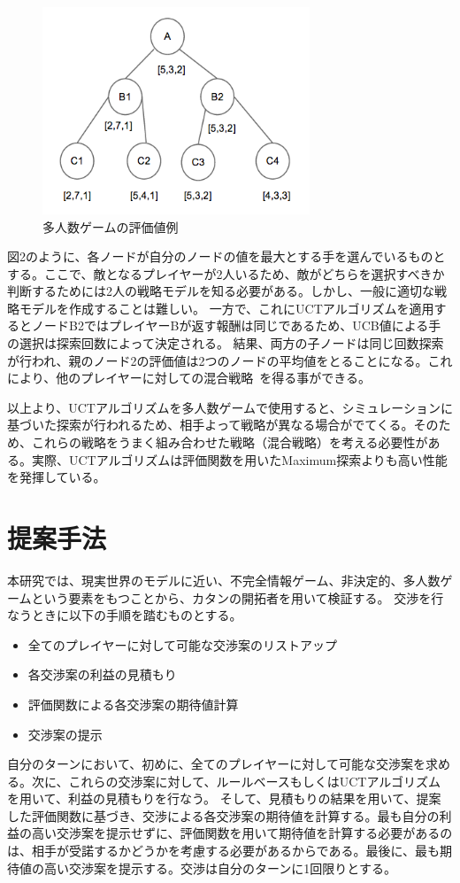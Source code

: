 \documentclass[a4, 10pt,dvipdfmx]{jsarticle}
\begin{document}
\begin{figure}[t]
    \begin{center}
      \includegraphics[width=80mm]{img/multi_agent_tree.png}
    \end{center}
    \caption{多人数ゲームの評価値例}
    \label{multi_agent_tree}
\end{figure}

図2のように、各ノードが自分のノードの値を最大とする手を選んでいるものとする。ここで、敵となるプレイヤーが2人いるため、敵がどちらを選択すべきか判断するためには2人の戦略モデルを知る必要がある。しかし、一般に適切な戦略モデルを作成することは難しい。
一方で、これにUCTアルゴリズムを適用するとノードB2ではプレイヤーBが返す報酬は同じであるため、UCB値による手の選択は探索回数によって決定される。
結果、両方の子ノードは同じ回数探索が行われ、親のノード2の評価値は2つのノードの平均値をとることになる。これにより、他のプレイヤーに対しての混合戦略~\cite{nash1951non}を得る事ができる。

以上より、UCTアルゴリズムを多人数ゲームで使用すると、シミュレーションに基づいた探索が行われるため、相手よって戦略が異なる場合がでてくる。そのため、これらの戦略をうまく組み合わせた戦略（混合戦略）を考える必要性がある。実際、UCTアルゴリズムは評価関数を用いたMaximum探索よりも高い性能を発揮している。


\section{提案手法}

本研究では、現実世界のモデルに近い、不完全情報ゲーム、非決定的、多人数ゲームという要素をもつことから、カタンの開拓者を用いて検証する。
交渉を行なうときに以下の手順を踏むものとする。
\begin{itemize}
 \item 全てのプレイヤーに対して可能な交渉案のリストアップ
 \item 各交渉案の利益の見積もり
 \item 評価関数による各交渉案の期待値計算
 \item 交渉案の提示
\end{itemize}
自分のターンにおいて、初めに、全てのプレイヤーに対して可能な交渉案を求める。次に、これらの交渉案に対して、ルールベースもしくはUCTアルゴリズムを用いて、利益の見積もりを行なう。
そして、見積もりの結果を用いて、提案した評価関数に基づき、交渉による各交渉案の期待値を計算する。最も自分の利益の高い交渉案を提示せずに、評価関数を用いて期待値を計算する必要があるのは、相手が受諾するかどうかを考慮する必要があるからである。最後に、最も期待値の高い交渉案を提示する。交渉は自分のターンに1回限りとする。
\end{document}
